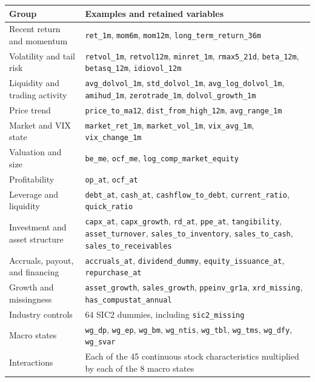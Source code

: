\documentclass[11pt,a4paper]{article}
\newcommand{\code}[1]{\texttt{#1}}
\begin{document}
\begin{center}
\small
\begin{tabularx}{\textwidth}{p{3.8cm}Y}
\toprule
Group & Examples and retained variables \\
\midrule

Recent return and momentum
&
\code{ret\_1m},
\code{mom6m},
\code{mom12m},
\code{long\_term\_return\_36m}
\\

Volatility and tail risk
&
\code{retvol\_1m},
\code{retvol12m},
\code{minret\_1m},
\code{rmax5\_21d},
\code{beta\_12m},
\code{betasq\_12m},
\code{idiovol\_12m}
\\

Liquidity and trading activity
&
\code{avg\_dolvol\_1m},
\code{std\_dolvol\_1m},
\code{avg\_log\_dolvol\_1m},
\code{amihud\_1m},
\code{zerotrade\_1m},
\code{dolvol\_growth\_1m}
\\

Price trend
&
\code{price\_to\_ma12},
\code{dist\_from\_high\_12m},
\code{avg\_range\_1m}
\\

Market and VIX state
&
\code{market\_ret\_1m},
\code{market\_vol\_1m},
\code{vix\_avg\_1m},
\code{vix\_change\_1m}
\\

Valuation and size
&
\code{be\_me},
\code{ocf\_me},
\code{log\_comp\_market\_equity}
\\

Profitability
&
\code{op\_at},
\code{ocf\_at}
\\

Leverage and liquidity
&
\code{debt\_at},
\code{cash\_at},
\code{cashflow\_to\_debt},
\code{current\_ratio},
\code{quick\_ratio}
\\

Investment and asset structure
&
\code{capx\_at},
\code{capx\_growth},
\code{rd\_at},
\code{ppe\_at},
\code{tangibility},
\code{asset\_turnover},
\code{sales\_to\_inventory},
\code{sales\_to\_cash},
\code{sales\_to\_receivables}
\\

Accruals, payout, and financing
&
\code{accruals\_at},
\code{dividend\_dummy},
\code{equity\_issuance\_at},
\code{repurchase\_at}
\\

Growth and missingness
&
\code{asset\_growth},
\code{sales\_growth},
\code{ppeinv\_gr1a},
\code{xrd\_missing},
\code{has\_compustat\_annual}
\\

Industry controls
&
64 SIC2 dummies, including \code{sic2\_missing}
\\

Macro states
&
\code{wg\_dp},
\code{wg\_ep},
\code{wg\_bm},
\code{wg\_ntis},
\code{wg\_tbl},
\code{wg\_tms},
\code{wg\_dfy},
\code{wg\_svar}
\\

Interactions
&
Each of the 45 continuous stock characteristics multiplied by each of the
8 macro states
\\

\bottomrule
\end{tabularx}
\end{center}
\end{document}
